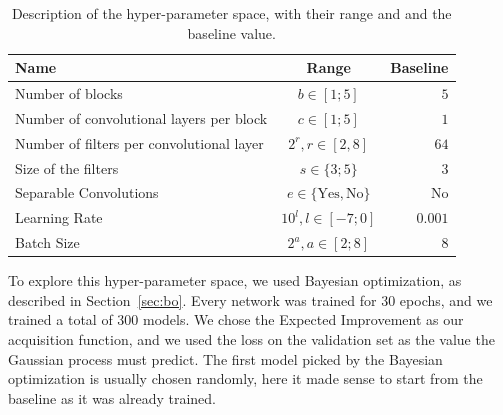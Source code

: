 \begin{table}
	\centering
	\begin{tabular}{ | l | c | r | }
		\hline
		Name & Range & Baseline \\ \hline
		Number of blocks & $b \in [1 ; 5]$ & $5$ \\
		Number of convolutional layers per block & $c \in [1 ; 5]$ & $1$ \\
		Number of filters per convolutional layer & $2^{r}, r \in [2, 8]$ & $64$ \\
		Size of the filters & $ s \in \{3 ; 5\}$ & $3$ \\
		Separable Convolutions & $e \in \{\text{Yes}, \text{No}\}$ & No \\
		Learning Rate & $10^{l}, l \in [-7 ; 0]$ & $0.001$ \\
		Batch Size & $2^{a}, a \in [2 ; 8]$ & 8 \\
		\hline
	\end{tabular}
	\caption{Description of the hyper-parameter space, with their range and and the baseline value.}
	\label{table:hyper}
\end{table}

To explore this hyper-parameter space, we used Bayesian optimization, as described in Section~\ref{sec:bo}. Every network was trained for 30 epochs, and we trained a total of 300 models. We chose the Expected Improvement as our acquisition function, and we used the loss on the validation set as the value the Gaussian process must predict. The first model picked by the Bayesian optimization is usually chosen randomly, here it made sense to start from the baseline as it was already trained.

